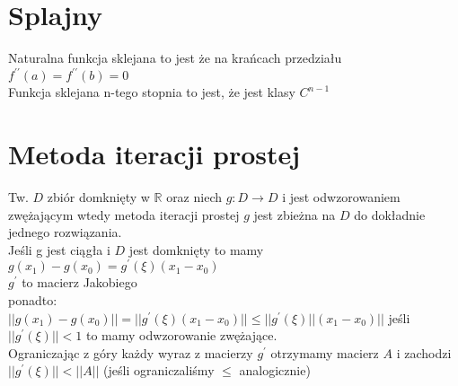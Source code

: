 \documentclass[twocolumn]{article}
\begin{document}
\begin{flushleft}
\section{Splajny}
Naturalna funkcja sklejana to jest że na krańcach przedziału $f^{\prime\prime}(a) = f^{\prime\prime}(b) =  0$\\
Funkcja sklejana n-tego stopnia to jest, że jest klasy $C^{n-1}$ 
\section{Metoda iteracji prostej}
Tw. $D$ zbiór domknięty w $\mathbb{R}$ oraz niech $g:D\rightarrow D$ i jest odwzorowaniem zwężającym wtedy metoda iteracji prostej $g$ jest zbieżna na $D$ do dokładnie jednego rozwiązania.\\
Jeśli g jest ciągła i $D$ jest domknięty to mamy\\
$g(x_1) - g(x_0) = g^{\prime}(\xi)(x_1 - x_0)$\\
$g^{\prime}$ to macierz Jakobiego\\
ponadto:\\
$||g(x_1) - g(x_0)|| = ||g^{\prime}(\xi)(x_1 - x_0)|| \leq ||g^{\prime}(\xi)||(x_1 - x_0)||$
jeśli $||g^{\prime}(\xi)|| < 1$ to mamy odwzorowanie zwężające.\\
Ograniczając z góry każdy wyraz z macierzy $g^{\prime}$ otrzymamy macierz $A$ i zachodzi $||g^{\prime}(\xi)|| < ||A||$ (jeśli ograniczaliśmy $\leq$ analogicznie)
\end{flushleft}
\thispagestyle{empty}
\end{document}
